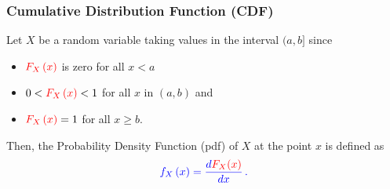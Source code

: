 \documentclass[notes=show,smaller,handout]{beamer}
\newenvironment{stepitemize}{\begin{itemize}[<+->]}{\end{itemize} }
\begin{document}
\begin{frame}%

\frametitle{Cumulative Distribution Function (CDF)}

Let $X$ be a random variable taking values in the interval $(a,b]$ since
\vspace{0.75cm}

\begin{stepitemize}
\item $\color{red}F_{X}\left( x\right)\color{black} $ is zero for all $x<a$ \vspace{0.25cm}
\item $0<\color{red}F_{X}\left( x\right)\color{black}<1 $ for all $x$ in $(a,b)$ and \vspace{0.25cm}
\item $\color{red}F_{X}\left( x\right)\color{black}=1 $ for all $x\geq b$.
\end{stepitemize}

\vspace{0.75cm}

Then, the Probability Density Function (\color{blue}pdf\color{black}) of $X$ at the point $x$ is defined as
\begin{equation*}
\color{blue}{f_{X}\left( x\right) =\frac{d\color{red}F_{X}(x)\color{black}}{dx}}\,.
\end{equation*}%

\end{frame}%

\end{document}
